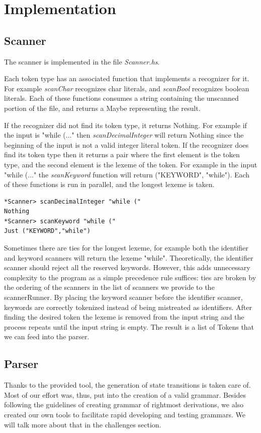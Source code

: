 \documentclass[12pt,letterpaper]{article}
\begin{document}
\section{Implementation}
\subsection{Scanner}
The scanner is implemented in the file \emph{Scanner.hs}.

Each token type has an associated function that implements a recognizer for it. For example \emph{scanChar} recognizes char literals, and \emph{scanBool} recognizes boolean literals. Each of these functions consumes a string containing the unscanned portion of the file, and returns a Maybe representing the result.

If the recognizer did not find its token type, it returns Nothing. For example if the input is "while (..." then \emph{scanDecimalInteger} will return Nothing since the beginning of the input is not a valid integer literal token. If the recognizer does find its token type then it returns a pair where the first element is the token type, and the second element is the lexeme of the token. For example in the input "while (..." the \emph{scanKeyword} function will return ("KEYWORD", "while"). Each of these functions is run in parallel, and the longest lexeme is taken.
\begin{lstlisting}
*Scanner> scanDecimalInteger "while ("
Nothing
*Scanner> scanKeyword "while ("
Just ("KEYWORD","while")
\end{lstlisting}

Sometimes there are ties for the longest lexeme, for example both the identifier and keyword scanners will return the lexeme "while". Theoretically, the identifier scanner should reject all the reserved keywords. However, this adds unnecessary complexity to the program as a simple precedence rule suffices: ties are broken by the ordering of the scanners in the list of scanners we provide to the scannerRunner. By placing the keyword scanner before the identifier scanner, keywords are correctly tokenized instead of being mistreated as identifiers. After finding the desired token the lexeme is removed from the input string and the process repeats until the input string is empty. The result is a list of Tokens that we can feed into the parser.

\subsection{Parser}
Thanks to the provided tool, the generation of state transitions is taken care of. Most of our effort was, thus, put into the creation of a valid grammar. Besides following the guidelines of creating grammar of rightmost derivations, we also created our own tools to facilitate rapid developing and testing grammars. We will talk more about that in the challenges section.
\end{document}
